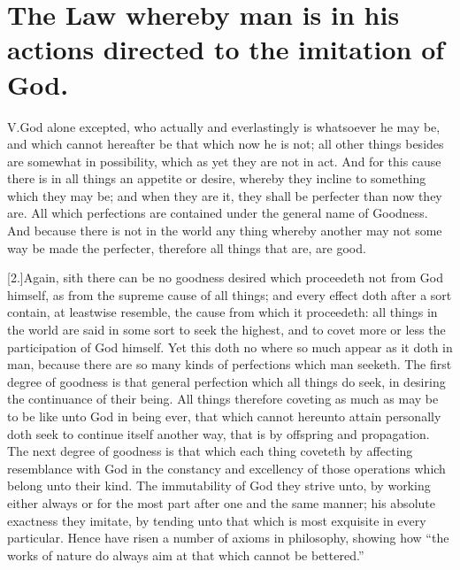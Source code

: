 \section*{The Law whereby man is in his actions directed to the imitation of God.}

V.God alone excepted, who actually and everlastingly is whatsoever he may be, and which cannot hereafter be that which now he is not; all other things besides are somewhat in possibility, which as yet they are not in act. And for this cause there is in all things an appetite or desire, whereby they incline to something which they may be; and when they are it, they shall be perfecter than now they are. All which perfections are contained under the general name of Goodness. And because there is not in the world any thing whereby another may not some way be made the perfecter, therefore all things that are, are good.

[2.]Again, sith there can be no goodness desired which proceedeth not from God himself, as from the supreme cause of all things; and every effect doth after a sort contain, at leastwise resemble, the cause from which it proceedeth: all things in the world are said in some sort to seek the highest, and to covet more or less the participation of God himself. Yet this doth no where so much appear as it doth in man, because there are so many kinds of perfections which man seeketh. The first degree of goodness is that general perfection which all things do seek, in desiring the continuance of their being. All things therefore coveting as much as may be to be like unto God in being ever, that which cannot hereunto  attain personally doth seek to continue itself another way, that is by offspring and propagation. The next degree of goodness is that which each thing coveteth by affecting resemblance with God in the constancy and excellency of those operations which belong unto their kind. The immutability of God they strive unto, by working either always or for the most part after one and the same manner; his absolute exactness they imitate, by tending unto that which is most exquisite in every particular. Hence have risen a number of axioms in philosophy, showing how “the works of nature do always aim at that which cannot be bettered.”


